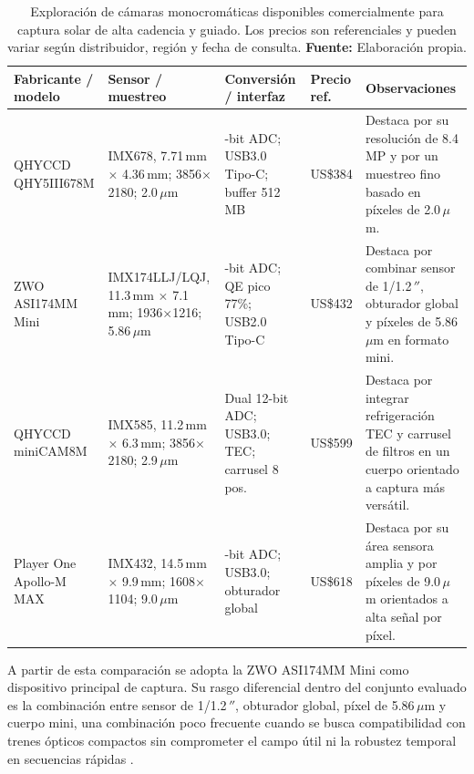 \begin{table}[H]
\centering
\caption{Exploración de cámaras monocromáticas disponibles comercialmente para captura solar de alta cadencia y guiado. Los precios son referenciales y pueden variar según distribuidor, región y fecha de consulta. \textbf{Fuente:} Elaboración propia.}
\label{tab:comparacion_camaras_proyecto}
\uniformtablestyle
\begin{tabularx}{\textwidth}{>{\raggedright\arraybackslash}p{2.9cm} >{\raggedright\arraybackslash}p{2.8cm} >{\raggedright\arraybackslash}p{2.15cm} >{\centering\arraybackslash}p{1.3cm} X}
\toprule
\textbf{Fabricante / modelo} & \textbf{Sensor / muestreo} & \textbf{Conversión / interfaz} & \textbf{Precio ref.} & \textbf{Observaciones} \\
\midrule
QHYCCD QHY5III678M & IMX678, 7.71\,mm $\times$ 4.36\,mm; 3856$\times$2180; 2.0\,$\mu$m & 12-bit ADC; USB3.0 Tipo-C; buffer 512 MB & US\$384 & Destaca por su resolución de 8.4 MP y por un muestreo fino basado en píxeles de 2.0\,$\mu$m. \\
ZWO ASI174MM Mini & IMX174LLJ/LQJ, 11.3\,mm $\times$ 7.1\,mm; 1936$\times$1216; 5.86\,$\mu$m & 12-bit ADC; QE pico 77\%; USB2.0 Tipo-C & US\$432 & Destaca por combinar sensor de 1/1.2\,$''$, obturador global y píxeles de 5.86\,$\mu$m en formato mini. \\
QHYCCD miniCAM8M & IMX585, 11.2\,mm $\times$ 6.3\,mm; 3856$\times$2180; 2.9\,$\mu$m & Dual 12-bit ADC; USB3.0; TEC; carrusel 8 pos. & US\$599 & Destaca por integrar refrigeración TEC y carrusel de filtros en un cuerpo orientado a captura más versátil. \\
Player One Apollo-M MAX & IMX432, 14.5\,mm $\times$ 9.9\,mm; 1608$\times$1104; 9.0\,$\mu$m & 12-bit ADC; USB3.0; obturador global & US\$618 & Destaca por su área sensora amplia y por píxeles de 9.0\,$\mu$m orientados a alta señal por píxel. \\
\bottomrule
\end{tabularx}
\end{table}

A partir de esta comparación se adopta la ZWO ASI174MM Mini como dispositivo principal de captura. Su rasgo diferencial dentro del conjunto evaluado es la combinación entre sensor de 1/1.2\,$''$, obturador global, píxel de 5.86\,$\mu$m y cuerpo mini, una combinación poco frecuente cuando se busca compatibilidad con trenes ópticos compactos sin comprometer el campo útil ni la robustez temporal en secuencias rápidas \citep{zwoASI174Manual2025,zwoGuideCameras2025,qhyQHY5III6782026,qhyMiniCAM8M2026,playerOneApolloMMax2026}.

